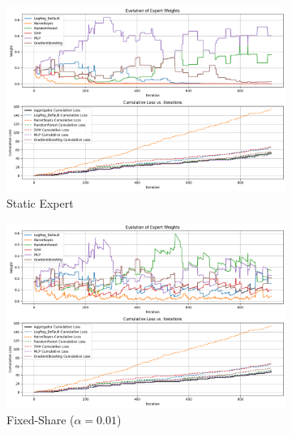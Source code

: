 \documentclass{article}
\begin{document}
    \begin{figure}[ht]
      \centering
      \begin{subfigure}[b]{0.3\textwidth}
        \includegraphics[width=\textwidth]{spambase_static.png}
        \caption{Static Expert}
        \label{fig:supervised_static_weights}
      \end{subfigure}
      \begin{subfigure}[b]{0.3\textwidth}
        \includegraphics[width=\textwidth]{spambase_fixed_0.01.png}
        \caption{Fixed-Share ($\alpha = 0.01$)}
        \label{fig:supervised_fixed_share_weights_0.01}
      \end{subfigure}
      \\
      \begin{subfigure}[b]{0.3\textwidth}

\end{subfigure}
\end{figure}
\end{document}
